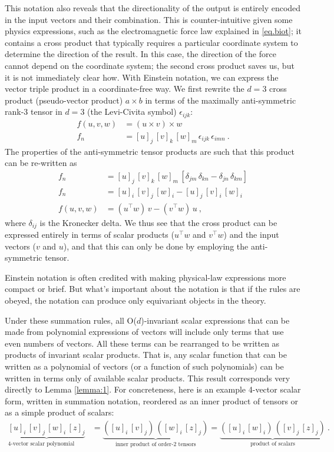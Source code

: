 \documentclass{article}
\theoremstyle{Hogg}
\begin{document}
This notation also reveals that the directionality of the output is entirely encoded in the input vectors and their combination.
This is counter-intuitive given some physics expressions, such as the electromagnetic force law explained in \eqref{eq.biot}; it contains a cross product that typically requires a particular coordinate system to determine the direction of the result.
In this case, the direction of the force cannot depend on the coordinate system; the second cross product saves us, but it is not immediately clear how. 
With Einstein notation, we can express the vector triple product in a coordinate-free way.
We first rewrite the $d=3$ cross product (pseudo-vector product) $a\times b$ in terms of the maximally anti-symmetric rank-3 tensor in $d=3$ (the Levi-Civita symbol) $\epsilon_{ijk}$:
\begin{align}
    f(u, v, w) &= (u\times v)\times w
    \\
    f_n &= [u]_j\,[v]_k\,[w]_m\,\epsilon_{ijk}\,\epsilon_{imn}
    ~.
\end{align}
The properties of the anti-symmetric tensor products are such that this product can be re-written as
\begin{align}
    f_n &= [u]_j\,[v]_k\,[w]_m\,[\delta_{jm}\,\delta_{kn} - \delta_{jn}\,\delta_{km}]
    \\
    f_n &= [u]_i\,[v]_j\,[w]_i - [u]_j\,[v]_i\,[w]_i
    \\
    f(u, v, w) &= (u^\top w)\,v - (v^\top w)\,u
    ~,
\end{align}
where $\delta_{ij}$ is the Kronecker delta.
We thus see that the cross product can be expressed entirely in terms of scalar products ($u^\top w$ and $v^\top w$) and the input vectors ($v$ and $u$), and that this can only be done by employing the anti-symmetric tensor.

Einstein notation is often credited with making physical-law expressions more compact or brief.
But what's important about the notation is that if the rules are obeyed, the notation can produce only equivariant objects in the theory.

Under these summation rules, all O($d$)-invariant scalar expressions that can be made from polynomial expressions of vectors will include only terms that use even numbers of vectors.
All these terms can be rearranged to be written as products of invariant scalar products.
That is, any scalar function that can be written as a polynomial of vectors (or a function of such polynomials) can be written in terms only of available scalar products.
This result corresponds very directly to Lemma \ref{lemma:1}.
For concreteness, here is an example 4-vector scalar form, written in summation notation, reordered as an inner product of tensors or as a simple product of scalars:
\begin{align}
\underbrace{[u]_i\,[v]_j\,[w]_i\,[z]_j}_{\text{4-vector scalar polynomial term}}&=\underbrace{([u]_i\,[v]_j)\,([w]_i\,[z]_j)}_{\text{inner product of order-2 tensors}}=\underbrace{([u]_i\,[w]_i)\,([v]_j\,[z]_j)}_{\text{product of scalars}}
~.
\end{align}
\end{document}
